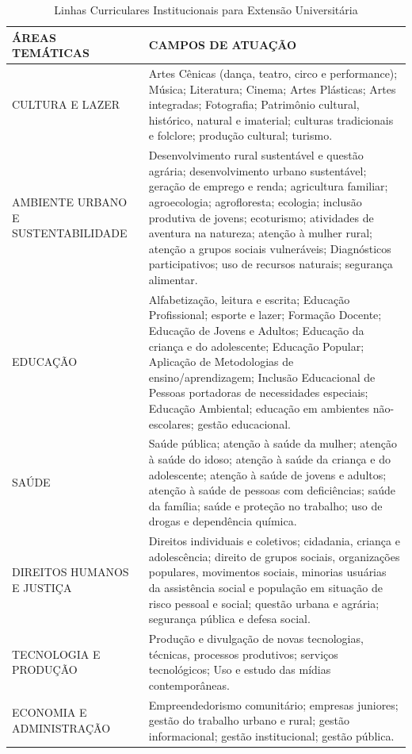 \documentclass[a4paper, 12pt, openright, oneside, german, french, english, brazil]{abntex2}
\begin{document}
\begin{table}[th]
  \footnotesize
  \centering
  \caption{Linhas Curriculares Institucionais para Extensão Universitária}
  \label{tab-extensao}
  \begin{tabular}{|p{5cm}|p{10cm}|}
    \hline
    \textbf{ÁREAS TEMÁTICAS} & \textbf{CAMPOS DE ATUAÇÃO} \\
    \hline
    CULTURA E LAZER & Artes Cênicas (dança, teatro, circo e performance); Música; Literatura; Cinema; Artes Plásticas; Artes integradas; Fotografia; Patrimônio cultural, histórico, natural e imaterial; culturas tradicionais e folclore; produção cultural; turismo. \\
    \hline
    AMBIENTE URBANO E SUSTENTABILIDADE & Desenvolvimento rural sustentável e questão agrária; desenvolvimento urbano sustentável; geração de emprego e renda; agricultura familiar; agroecologia; agrofloresta; ecologia; inclusão produtiva de jovens; ecoturismo; atividades de aventura na natureza; atenção à mulher rural; atenção a grupos sociais vulneráveis; Diagnósticos participativos; uso de recursos naturais; segurança alimentar. \\
    \hline
    EDUCAÇÃO & Alfabetização, leitura e escrita; Educação Profissional; esporte e lazer; Formação Docente; Educação de Jovens e Adultos; Educação da criança e do adolescente; Educação Popular; Aplicação de Metodologias de ensino/aprendizagem; Inclusão Educacional de Pessoas portadoras de necessidades especiais; Educação Ambiental; educação em ambientes não- escolares; gestão educacional. \\
    \hline
    SAÚDE & Saúde pública; atenção à saúde da mulher; atenção à saúde do idoso; atenção à saúde da criança e do adolescente; atenção à saúde de jovens e adultos; atenção à saúde de pessoas com deficiências; saúde da família; saúde e proteção no trabalho; uso de drogas e dependência química. \\
    \hline
    DIREITOS HUMANOS E JUSTIÇA & Direitos individuais e coletivos; cidadania, criança e adolescência; direito de grupos sociais, organizações populares, movimentos sociais, minorias usuárias da assistência social e população em situação de risco pessoal e social; questão urbana e agrária; segurança pública e defesa social. \\
    \hline
    TECNOLOGIA E PRODUÇÃO & Produção e divulgação de novas tecnologias, técnicas, processos produtivos; serviços tecnológicos; Uso e estudo das mídias contemporâneas. \\
    \hline
    ECONOMIA E ADMINISTRAÇÃO & Empreendedorismo comunitário; empresas juniores; gestão do trabalho urbano e rural; gestão informacional; gestão institucional; gestão pública.\\
    \hline
  \end{tabular}
\end{table}
\end{document}
